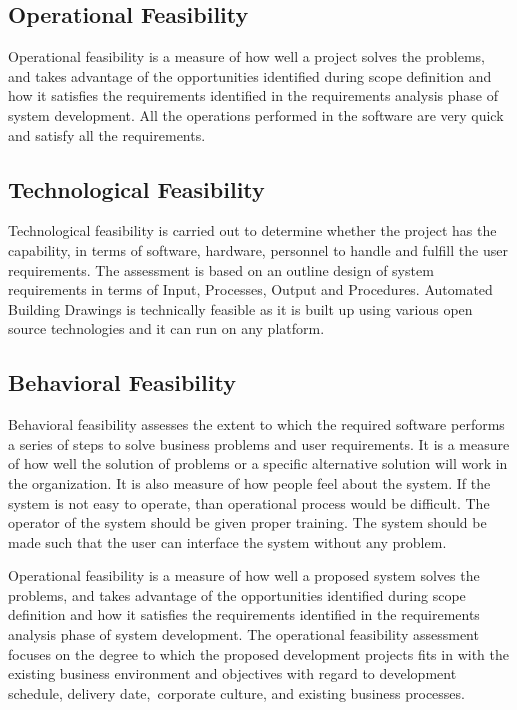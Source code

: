\subsection{Operational Feasibility}
\noindent Operational feasibility is a measure of how well a project solves the problems, and takes advantage of
the opportunities identified during scope definition and how it satisfies the requirements identified in
the requirements analysis phase of system development. All the operations performed in the software
are very quick and satisfy all the requirements.

\subsection{Technological Feasibility}
\noindent Technological feasibility is carried out to determine whether the project has the capability, in terms
of software, hardware, personnel to handle and fulfill the user requirements. The assessment is based
on an outline design of system requirements in terms of Input, Processes, Output and Procedures.
Automated Building Drawings is technically feasible as it is built up using various open source technologies and it can run on any platform.
\subsection{Behavioral Feasibility}
Behavioral feasibility assesses the extent to which the required software performs a series of steps to solve business problems and user requirements. It is a measure of how well the solution of problems or a specific alternative solution will work in the organization. It is also measure of how people feel about the system. If the system is not easy to operate, than operational process would be difficult. The operator of the system should be given proper training. The system should be made such that the user can interface the system without any problem.

Operational feasibility is a measure of how well a proposed system solves the problems, and takes advantage of the opportunities identified during scope definition and how it satisfies the requirements identified in the requirements analysis phase of system development. The operational feasibility assessment focuses on the degree to which the proposed development projects fits in with the existing business environment and objectives with regard to development schedule, delivery date, corporate culture, and existing business processes.

